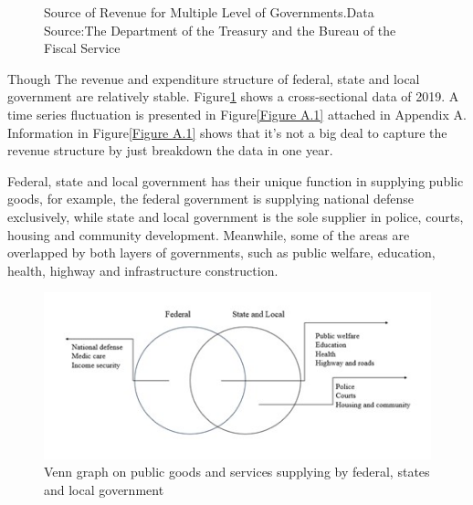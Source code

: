 \begin{figure}[H]
    \caption[Source of Revenue for Multiple Level of Governments in 2019]{Source of Revenue for Multiple Level of Governments.Data Source:The Department of the Treasury and the Bureau of the Fiscal Service }    %
    \label{Figure 1.3}    
    \end{figure}

Though The revenue and expenditure structure of federal, state and local government are relatively stable. Figure\ref*{Figure 1.3} shows a cross-sectional data of 2019. A time series fluctuation is presented in Figure\ref*{Figure A.1} attached in Appendix A. Information in Figure\ref*{Figure A.1} shows that it's not a big deal to capture the revenue structure by just breakdown the data in one year.


Federal, state and local government has their unique function in supplying public goods, for example, the federal government is supplying national defense exclusively, while state and local government is the sole supplier in police, courts, housing and community development. Meanwhile, some of the areas are overlapped by both layers of governments, such as public welfare, education, health, highway and infrastructure construction.

\begin{figure}[htb]
    \centering
    \includegraphics[scale=1]{Chapter-1/Figures/Venn graph on public goods.jpg}
    \caption[Venn graph on public goods and services supplying]{Venn graph on public goods and services supplying by federal, states and local government
    \texttt{} }
    \label{Figure 1.4}
\end{figure}

